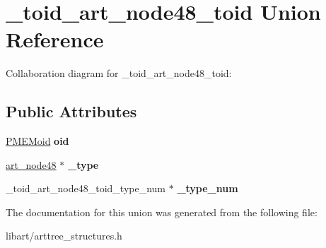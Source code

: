\hypertarget{union__toid__art__node48__toid}{}\section{\+\_\+toid\+\_\+art\+\_\+node48\+\_\+toid Union Reference}
\label{union__toid__art__node48__toid}


Collaboration diagram for \+\_\+toid\+\_\+art\+\_\+node48\+\_\+toid\+:
\subsection*{Public Attributes}
\begin{DoxyCompactItemize}
\item 
\mbox{\label{union__toid__art__node48__toid_a0489ea7eb3c98660ca61834892a0ffdb}} 
\hyperlink{structpmemoid}{P\+M\+E\+Moid} {\bfseries oid}
\item 
\mbox{\label{union__toid__art__node48__toid_a2760e4109502625dacca967a36f78a70}} 
\hyperlink{struct__art__node48}{art\+\_\+node48} $\ast$ {\bfseries \+\_\+type}
\item 
\mbox{\label{union__toid__art__node48__toid_a032f85b0270a114961ebf818378e5dbe}} 
\+\_\+toid\+\_\+art\+\_\+node48\+\_\+toid\+\_\+type\+\_\+num $\ast$ {\bfseries \+\_\+type\+\_\+num}
\end{DoxyCompactItemize}


The documentation for this union was generated from the following file\+:\begin{DoxyCompactItemize}
\item 
libart/arttree\+\_\+structures.\+h\end{DoxyCompactItemize}

